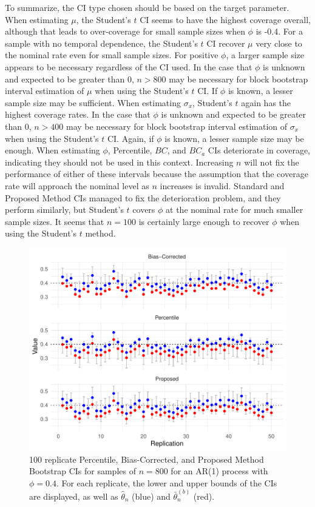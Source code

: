 \documentclass[12pt, letterpaper, titlepage]{article}
\begin{document}
To summarize, the CI type chosen should be based on the target parameter. 
When estimating $\mu$, the Student's $t$ CI seems to have the highest
 coverage
overall, although that leads to over-coverage for small sample sizes when $\phi$
 is -0.4. For a
sample with no temporal dependence, the Student's $t$ CI recover $\mu$ 
very close to the nominal rate even for small sample sizes. For positive $\phi$, a
larger sample size appears to be necessary regardless of the CI used. In the
case that $\phi$ is unknown and expected to be greater than $0$, $n > 800$
may be
necessary for block bootstrap interval estimation of $\mu$ when using the
Student's $t$ CI. If $\phi$ is known,
a lesser sample size may be sufficient. When estimating $\sigma_x$,
Student's $t$ again has the highest coverage
rates. In the case that $\phi$ is unknown and expected to be greater than $0$,
$n > 400$ may be necessary for block bootstrap interval estimation of
$\sigma_x$ when using the Student's $t$ CI. Again, if $\phi$ is known, a lesser
sample size may be enough.
When estimating $\phi$, Percentile, $BC$, and $BC_a$ CIs 
deteriorate in coverage, indicating they should not be used in this context. 
Increasing $n$ will not fix the performance of either of these intervals 
because the assumption that the coverage rate will approach the nominal level
as $n$ increases is invalid. Standard and Proposed Method CIs managed to fix
the
deterioration problem, and they perform similarly, but Student's $t$ covers
$\phi$ at the nominal rate for much smaller sample sizes. It seems that 
$n = 100$ is certainly large enough to
recover $\phi$ when using the Student's $t$ method.


\begin{figure}[tbp]
  \centering
  \includegraphics[width=\textwidth]{figures/norm_phi_intervals}
  \caption{100 replicate Percentile, Bias-Corrected, and Proposed Method
  Bootstrap CIs for samples of $n = 800$ for
    an AR(1) process with $\phi = 0.4$. For each replicate, the lower and upper
    bounds
    of the CIs are displayed, as well as $\hat\theta_n$ (blue) and $
    \bar\theta_n^{(b)}$ (red). }
  \label{fig:npi}
\end{figure}
\end{document}
